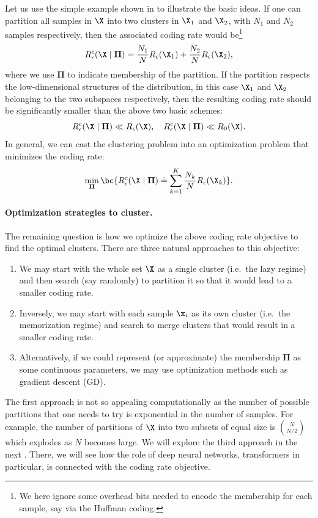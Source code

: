 \documentclass[../../book-main.tex]{subfiles}
\begin{document}
Let us use the simple example shown in  to illustrate the basic ideas. If one can partition all samples in $\X$ into two clusters in $\X_1$ and $\X_2$, with $N_1$ and $N_2$ samples respectively, then the associated coding rate would be\footnote{We here ignore some overhead bits needed to encode the membership for each sample, say via the Huffman coding.}
\begin{equation}
	R_{\epsilon}^c(\X\mid \boldsymbol{\Pi}) = \frac{N_1}{N}R_{\epsilon}(\X_1) + \frac{N_2}{N}R_{\epsilon}(\X_2),
\end{equation}
where we use $\boldsymbol{\Pi}$ to indicate membership of the partition. If the partition respects the low-dimensional structures of the distribution, in this case $\X_1$ and $\X_2$ belonging to the two subspaces respectively, then the resulting coding rate should be significantly smaller than the above two basic schemes:
\begin{equation}
	R_{\epsilon}^c(\X \mid \boldsymbol{\Pi}) \ll R_{\epsilon}(\X), \quad     R_{\epsilon}^c(\X \mid \boldsymbol{\Pi}) \ll R_0(\X).
\end{equation}
In general, we can cast the clustering problem into an optimization problem that minimizes the coding rate:
\begin{equation}
	\min_{\boldsymbol{\Pi}}  \bc{ R_{\epsilon}^c(\X \mid \boldsymbol{\Pi})
	\doteq \sum_{k=1}^K \frac{N_k}{N}R_{\epsilon}(\X_k)}.
\end{equation}

\paragraph{Optimization strategies to cluster.}
The remaining question is how we optimize the above coding rate objective to find the optimal clusters. There are three natural approaches to this objective:
\begin{enumerate}
	\item We may start with the whole set $\X$ as a single cluster (i.e.\ the lazy regime) and then search (say randomly) to partition it so that it would lead to a smaller coding rate.
	\item Inversely, we may start with each sample $\x_i$ as its own cluster
		(i.e.\ the memorization regime)  and search to merge clusters that would result in a smaller coding rate.
	\item Alternatively, if we could represent (or approximate) the membership $\boldsymbol{\Pi}$ as some continuous parameters, we may use optimization methods such as gradient descent (GD).
\end{enumerate}
The first approach is not so appealing computationally as the number of possible partitions that one needs to try is exponential in the number of samples. For example, the number of partitions of $\X$ into two subsets of equal size is $N \choose N/2$ which explodes as $N$ becomes large. We will explore the third approach in the next . There, we will see how the role of deep neural networks, transformers in particular, is connected with the coding rate objective.
\end{document}
